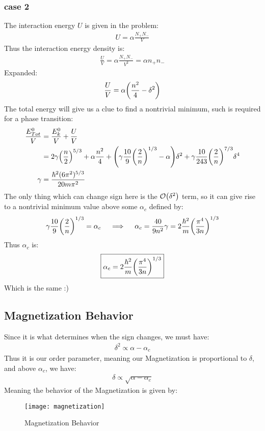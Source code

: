 \documentclass[12pt]{article}
\theoremstyle{plain}
\theoremstyle{definition}
\begin{document}
\subsubsection{case 2}
The interaction energy $U$ is given in the problem:
\begin{align*}
  U=\alpha\frac{N_+N_-}{V}
\end{align*}
Thus the interaction energy density is:
\begin{align*}
  \frac{U}{V}=\alpha\frac{N_+N_-}{V^2}=\alpha n_+n_-
\end{align*}
Expanded:
\begin{align*}
  \frac{U}{V}=\alpha\qty(\frac{n^2}{4}-\delta^2)
\end{align*}
The total energy will give us a clue to find a nontrivial minimum, such is required for a phase transition:
\begin{align*}
  \frac{E^0_{Tot}}{V}&=\frac{E_k^0}{V}+\frac{U}{V}\\
  &=2\gamma\qty(\frac{n}{2})^{5/3}+\alpha\frac{n^2}{4}
  +\qty(\gamma\frac{10}9\qty(\frac2n)^{1/3}-\alpha)\delta^2
  +\gamma\frac{10}{243}\qty(\frac2n)^{7/3}\delta^4\\
  \gamma&=\frac{\hbar^2(6\pi^2)^{5/3}}{20m\pi^2}
\end{align*}
The only thing which can change sign here is the $\order{\delta^2}$ term, so it can give rise to a nontrivial minimum value above some $\alpha_c$ defined by:
\begin{align*}
  \gamma\frac{10}{9}\qty(\frac2n)^{1/3}=\alpha_c\quad\implies\quad
  \alpha_c=\frac{40}{9n^2}\gamma=2\frac{\hbar^2}{m}\qty(\frac{\pi^4}{3n})^{1/3}
\end{align*}
Thus $\alpha_c$ is:
\begin{align*}
  \boxed{\alpha_c=2\frac{\hbar^2}{m}\qty(\frac{\pi^4}{3n})^{1/3}}
\end{align*}
Which is the same :)
\subsection{Magnetization Behavior}
Since it is what determines when the sign changes, we must have:
\begin{align*}
  \delta^2\propto \alpha-\alpha_c
\end{align*}
Thus it is our order parameter, meaning our Magnetization is proportional to $\delta$, and above $\alpha_c$, we have:
\begin{align*}
  \delta\propto\sqrt{\alpha-\alpha_c}
\end{align*}
Meaning the behavior of the Magnetization is given by:
\begin{figure}[H]
  \centering
  \texttt{[image: magnetization]}
  \caption{Magnetization Behavior}
\end{figure}
\end{document}
